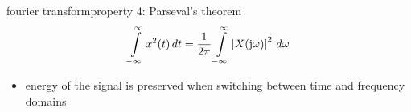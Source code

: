         \begin{frame}{fourier transform}{property 4: Parseval's theorem}
            \begin{equation*}
                \int\limits_{-\infty}^{\infty}{x^2(t)\, dt} = \frac{1}{2\pi}\int\limits_{-\infty}^{\infty} {\left|X(\mathrm{j}\omega)\right|^2\, d\omega} 
            \end{equation*}
            
            \bigskip
            \begin{itemize}
                \item<2->   energy of the signal is preserved when switching between time and frequency domains
            \end{itemize}
        \end{frame}	

